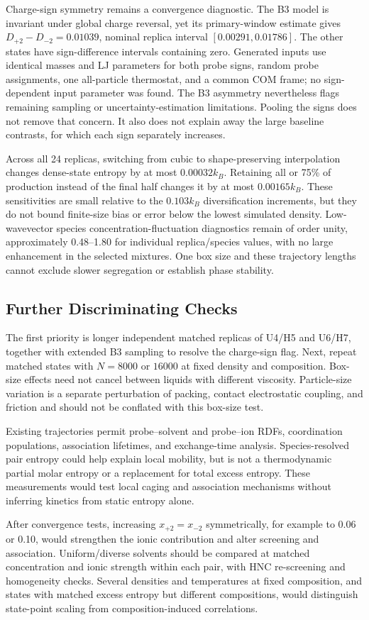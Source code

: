 Charge-sign symmetry remains a convergence diagnostic. The B3 model is invariant under global charge reversal, yet its primary-window estimate gives $D_{+2}-D_{-2}=0.01039$, nominal replica interval $[0.00291,0.01786]$. The other states have sign-difference intervals containing zero. Generated inputs use identical masses and LJ parameters for both probe signs, random probe assignments, one all-particle thermostat, and a common COM frame; no sign-dependent input parameter was found. The B3 asymmetry nevertheless flags remaining sampling or uncertainty-estimation limitations. Pooling the signs does not remove that concern. It also does not explain away the large baseline contrasts, for which each sign separately increases.

Across all 24 replicas, switching from cubic to shape-preserving interpolation changes dense-state entropy by at most $0.00032k_B$. Retaining all or 75\% of production instead of the final half changes it by at most $0.00165k_B$. These sensitivities are small relative to the $0.103k_B$ diversification increments, but they do not bound finite-size bias or error below the lowest simulated density. Low-wavevector species concentration-fluctuation diagnostics remain of order unity, approximately 0.48--1.80 for individual replica/species values, with no large enhancement in the selected mixtures. One box size and these trajectory lengths cannot exclude slower segregation or establish phase stability.



\subsection{Further Discriminating Checks}

The first priority is longer independent matched replicas of U4/H5 and U6/H7, together with extended B3 sampling to resolve the charge-sign flag. Next, repeat matched states with $N=8000$ or $16000$ at fixed density and composition. Box-size effects need not cancel between liquids with different viscosity. Particle-size variation is a separate perturbation of packing, contact electrostatic coupling, and friction and should not be conflated with this box-size test.

Existing trajectories permit probe--solvent and probe--ion RDFs, coordination populations, association lifetimes, and exchange-time analysis. Species-resolved pair entropy could help explain local mobility, but is not a thermodynamic partial molar entropy or a replacement for total excess entropy. These measurements would test local caging and association mechanisms without inferring kinetics from static entropy alone.

After convergence tests, increasing $x_{+2}=x_{-2}$ symmetrically, for example to 0.06 or 0.10, would strengthen the ionic contribution and alter screening and association. Uniform/diverse solvents should be compared at matched concentration and ionic strength within each pair, with HNC re-screening and homogeneity checks. Several densities and temperatures at fixed composition, and states with matched excess entropy but different compositions, would distinguish state-point scaling from composition-induced correlations.
